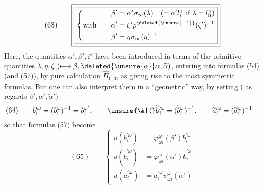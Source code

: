 \[
(63)\qquad\boxed{\boxed{\left\{\begin{aligned}
\beta'&=\alpha'\sigma_\infty(\lambda)\quad(=\alpha'l_1^\gamma\text{ if }\lambda=l_0^\gamma)\\
\text{with}\qquad\alpha'&=\zeta'\rho^{\deleted{\unsure{-1}}}(\zeta')^{-1}\\
\beta'&=\eta\sigma_\infty(\eta)^{-1}
\end{aligned}\right.}}
\]
Here, the quantities $\alpha',\beta',\zeta'$ have been introduced in terms of the primitive quantities $\lambda,\eta,\zeta$ $(\longmapsto\beta,\deleted{\unsure{\alpha}}\alpha,\widetilde\alpha)$, entering into formulas (54) (and (57)), by pure calculation   $\widehat\Pi_{0,3}$, as giving rise to the most symmetric formulas. But one can also interpret them in a ``geometric'' way, by setting ( as regards $\beta',\alpha',\widetilde\alpha'$)
\[
(64)\qquad\begin{aligned}
b_i^{\prime\omega}&=(b_i^\omega)^{-1}=b_i^{\omega'},\qquad
\unsure{\&|(}\widetilde b_i^{\prime\omega}=(\widetilde b_i^\omega)^{-1},\qquad
\widetilde a_i^{\prime\omega}=(\widetilde a_i^\omega)^{-1}
\end{aligned}
\]
so that formulas (57) become
\[
(65)\qquad\left\{\begin{aligned}
u(b_i^{\prime\omega})&=\varphi_{\omega i}^\omega(\beta')b_i^{\prime\omega}\\
u(\widetilde b_i^{\prime\omega})&=\varphi_{\omega i}^\omega(\alpha')\widetilde b_i^{\prime\omega}\\
u(\widetilde a_i^{\prime\omega})&=\widetilde a_i^{\prime\omega}\psi_{\omega i}^\omega(\widetilde\alpha')
\end{aligned}\right.
\]
